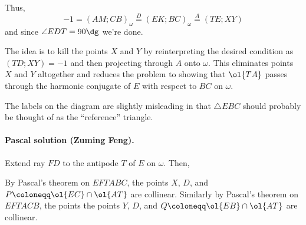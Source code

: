 \documentclass[11pt]{scrartcl}
\begin{document}
Thus,
\[ -1 = (AM;CB)_\omega \overset{D}{=} (EK;BC)_\omega \overset{A}{=} (TE;XY) \]
and since $\angle EDT = 90\dg$ we're done.

\begin{remark*}
  [Motivation]
  The idea is to kill the points $X$ and $Y$
  by reinterpreting the desired condition as $(TD;XY)=-1$
  and then projecting through $A$ onto $\omega$.
  This eliminates points $X$ and $Y$ altogether
  and reduces the problem to showing that $\ol{TA}$ passes
  through the harmonic conjugate of $E$ with respect to $BC$ on $\omega$.

  The labels on the diagram are slightly misleading in that
  $\triangle EBC$ should probably be thought of as the ``reference'' triangle.
\end{remark*}

\paragraph{Pascal solution (Zuming Feng).}
Extend ray $FD$ to the antipode $T$ of $E$ on $\omega$. Then,
\begin{itemize}
\ii By Pascal's theorem on $EFTABC$,
the points $X$, $D$, and $P \coloneqq \ol{EC} \cap \ol{AT}$ are collinear.
\ii Similarly by Pascal's theorem on $EFTACB$, the points
the points $Y$, $D$, and $Q \coloneqq \ol{EB} \cap \ol{AT}$ are collinear.
\end{itemize}
\end{document}
